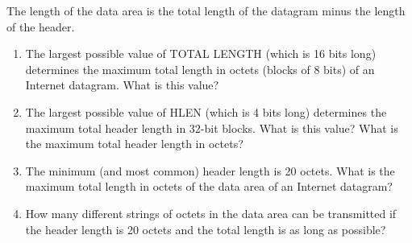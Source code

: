 \documentclass[11pt,a4paper]{book}
\begin{document}
\begin{enumerate}
The length of the data area is the total length of the datagram minus the length of the header.
\begin{enumerate}[label=(\alph*)]
\item The largest possible value of TOTAL LENGTH (which is 16 bits long) determines the maximum total length in octets (blocks of 8 bits) of an Internet datagram.
What is this value?
\item The largest possible value of HLEN (which is 4 bits long) determines the maximum total header length in 32-bit blocks.
What is this value?
What is the maximum total header length in octets?
\item The minimum (and most common) header length is 20 octets.
What is the maximum total length in octets of the data area of an Internet datagram?
\item How many different strings of octets in the data area can be transmitted if the header length is 20 octets and the total length is as long as possible?
\end{enumerate}
\end{enumerate}
\end{document}
